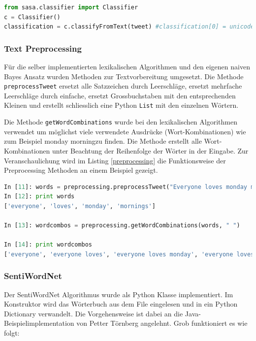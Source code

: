 \begin{lstlisting}[language=Python, caption={SASA Classifier}, label={lst:sasaexmaple}]
from sasa.classifier import Classifier
c = Classifier()
classification = c.classifyFromText(tweet) #classification[0] = unicode "neutral", "negative", "positive", "unsure", classification[1] = score
\end{lstlisting}
\subsubsection{Text Preprocessing}
\label{subsubsec:textpreprocessing}
Für die selber implementierten lexikalischen Algorithmen und den eigenen naiven Bayes Ansatz wurden Methoden zur Textvorbereitung umgesetzt. Die Methode \lstinline$preprocessTweet$ ersetzt alle Satzzeichen durch Leerschläge, ersetzt mehrfache Leerschläge durch einfache, ersetzt Grossbuchstaben mit den entsprechenden Kleinen und erstellt schliesslich eine Python \lstinline$List$ mit den einzelnen Wörtern.

Die Methode \lstinline$getWordCombinations$ wurde bei den lexikalischen Algorithmen verwendet um möglichst viele verwendete Ausdrücke (\flqq Wort-Kombinationen\frqq) wie zum Beispiel \flqq monday morning\frqq zu finden.  Die Methode erstellt alle Wort-Kombinationen unter Beachtung der Reihenfolge der Wörter in der Eingabe. Zur Veranschaulichung wird im Listing \ref{preprocessing} die Funktionsweise der Preprocessing Methoden an einem Beispiel gezeigt.

\begin{lstlisting}[language=Python, caption={Text Preprocessing}, label={lst:preprocessing}]
In [11]: words = preprocessing.preprocessTweet("Everyone loves monday mornings!") 
In [12]: print words
['everyone', 'loves', 'monday', 'mornings']

In [13]: wordcombos = preprocessing.getWordCombinations(words, " ")

In [14]: print wordcombos
['everyone', 'everyone loves', 'everyone loves monday', 'everyone loves monday mornings', 'loves', 'loves monday', 'loves monday mornings', 'monday',  'monday mornings', 'mornings']
\end{lstlisting} 

\subsubsection{SentiWordNet}
Der SentiWordNet Algorithmus wurde als Python Klasse implementiert. Im Konstruktor wird das Wörterbuch aus dem File eingelesen und in ein Python Dictionary verwandelt. Die Vorgehensweise ist dabei an die Java-Beispielimplementation von Petter Törnberg \cite{sentiwordnetjava} angelehnt. Grob funktioniert es wie folgt:

